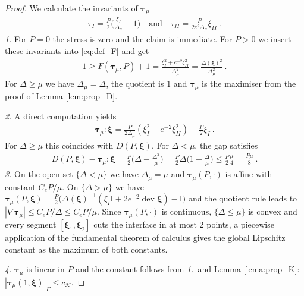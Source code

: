 \documentclass{article}
\theoremstyle{definition}
\newcommand{\bftau}{\boldsymbol{\tau}}
\newcommand{\bfxi}{\boldsymbol{\xi}}
\newcommand{\bfI}{\boldsymbol{\mathrm{I}}}
\newcommand{\K}{\mathcal{K}}
\DeclareMathOperator{\dev}{dev}
\begin{document}
\begin{proof}
    We calculate the invariants of $\bftau_\mu$
    \begin{align*}
        \tau_I = \frac{P}{2}\Big(\frac{\xi_I}{\Delta_\mu}-1\Big) \quad \text{and} \quad \tau_{II} = \frac{P}{2e^2\Delta_\mu}\xi_{II} \ .
    \end{align*}
    \textit{1.}
    For $P=0$ the stress is zero and the claim is immediate. For $P>0$
    we insert these invariants into \eqref{eq:def_F} and get
    \begin{align*}
        1\geq F(\bftau_\mu, P) +1 =\frac{\xi_I^2+e^{-2}\xi_{II}^2}{\Delta_\mu^2} = \frac{\Delta(\bfxi)^2}{\Delta_\mu^2} \ .
    \end{align*}
    For $\Delta \geq \mu$ we have $\Delta_\mu = \Delta$, the quotient
    is $1$ and $\bftau_\mu$ is the maximiser from the proof of Lemma \ref{lem:prop_D}.

    \textit{2.}
    A direct computation yields
    \begin{align*}
        \bftau_\mu : \bfxi = \frac{P}{2\Delta_\mu}(\xi_I^2+e^{-2}\xi_{II}^2) - \frac{P}{2}\xi_I \ .
    \end{align*}
    For $\Delta \geq \mu$ this coincides with $D(P,\bfxi)$.
    For $\Delta < \mu$, the gap satisfies
    \begin{align*}
        D(P, \bfxi) - \bftau_\mu : \bfxi = \frac{P}{2} \Big(\Delta -\frac{\Delta^2}{\mu}\Big) = \frac{P}{2}\Delta \Big(1-\frac{\Delta}{\mu}\Big) \leq \frac{P}{2} \frac{\mu}{4} = \frac{P\mu}{8} \ .
    \end{align*}
    \textit{3.}
    On the open set $\{\Delta < \mu\}$ we have $\Delta_\mu = \mu$ and $\bftau_\mu(P,\cdot)$ is affine with constant $C_e P/\mu$.
    On $\{\Delta >\mu\}$ we have $\bftau_\mu(P,\bfxi) = \frac{P}{2}\big(\Delta(\bfxi)^{-1}(\xi_I\bfI+2e^{-2}\dev\bfxi)-\bfI \big)$ and the
    quotient rule leads to $|\nabla \bftau_\mu| \leq C_e P/\Delta \leq C_e P/\mu$. Since $\bftau_\mu(P,\cdot)$ is continuous, $\{\Delta \leq \mu\}$ is convex and every segment $[\bfxi_1, \bfxi_2]$ cuts the interface in at most 2 points, a piecewise application of the fundamental theorem of calculus gives the global Lipschitz constant as the maximum of both constants.

    \textit{4.} $\bftau_\mu$ is linear in $P$ and the constant follows from \textit{1.}\ and Lemma \ref{lema:prop_K}: $|\bftau_\mu(1,\bfxi)|_F \leq c_\K$.

\end{proof}
\end{document}
